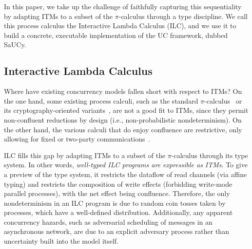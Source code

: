 In this paper, we take up the challenge of faithfully capturing this
sequentiality by adapting ITMs to a subset of the $\pi$-calculus through a type
discipline. We call this process calculus the Interactive Lambda Calculus (ILC),
and we use it to build a concrete, executable implementation of the UC
framework, dubbed SaUCy.


\subsection{Interactive Lambda Calculus}
Where have existing concurrency models fallen short with respect to ITMs? On the
one hand, some existing process calculi, such as the standard
$\pi$-calculus~\cite{milner1999communicating} or its cryptography-oriented
variants~\cite{abadi1999calculus, abadi2001mobile, lincoln1998probabilistic},
are not a good fit to ITMs, since they permit non-confluent reductions by design
(i.e., non-probabilistic nondeterminism).
On the other hand, the various calculi that do enjoy confluence are
restrictive, only allowing for fixed or two-party
communications~\cite{kobayashi1999linearity,bohl2016symbolic,fowler2018session}.

ILC fills this gap by adapting ITMs to a subset of the $\pi$-calculus through its
type system. In other words, \emph{well-typed ILC programs are expressible as
  ITMs}. To give a preview of the type system, it restricts the dataflow of read
channels (via affine typing) and restricts the composition of write effects
(forbidding write-mode parallel processes), with the net effect being
confluence. Therefore, the only nondeterminism in an ILC program is due to
random coin tosses taken by processes, which have a well-defined
distribution. Additionally, any apparent concurrency hazards, such as
adversarial scheduling of messages in an asynchronous network, are due to an
explicit adversary process rather than uncertainty built into the model itself.

